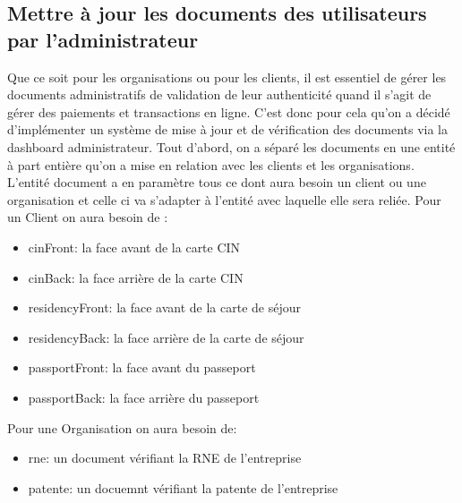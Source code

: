 \documentclass[../main.tex]{subfiles}
\begin{document}
\subsection{Mettre à jour les documents des utilisateurs par l'administrateur}
Que ce soit pour les organisations ou pour les clients, il est essentiel de gérer les documents administratifs de validation de leur authenticité quand il s'agit de gérer des paiements et transactions en ligne. C'est donc pour cela qu'on a décidé d'implémenter un système de mise à jour et de vérification des documents via la dashboard administrateur. 
Tout d'abord, on a séparé les documents en une entité à part entière qu'on a mise en relation avec les clients et les organisations. L'entité document a en paramètre tous ce dont aura besoin un client ou une organisation et celle ci va s'adapter à l'entité avec laquelle elle sera reliée.
Pour un Client on aura besoin de : 
\begin{itemize}
    \item cinFront: la face avant de la carte CIN
    \item cinBack: la face arrière de la carte CIN 
    \item residencyFront: la face avant de la carte de séjour
    \item residencyBack: la face arrière de la carte de séjour
    \item passportFront: la face avant du passeport
    \item passportBack: la face arrière du passeport   
\end{itemize}
Pour une Organisation on aura besoin de: 
\begin{itemize}
    \item rne: un document vérifiant la RNE de l'entreprise
    \item patente: un docuemnt vérifiant la patente de l'entreprise 
\end{itemize}
\end{document}
